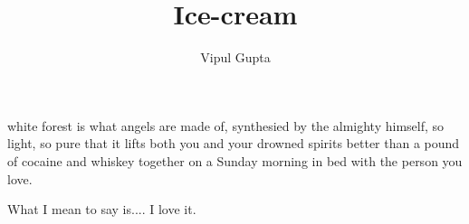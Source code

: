 \documentclass{article}
\begin{document}
\title{Ice-cream}
white forest is what angels are made of, synthesied by the almighty himself, so light, so pure that it lifts both you and your drowned spirits better than a pound of cocaine and whiskey together on a Sunday morning in bed with the person you love.\

What I mean to say is.... I love it. 
\author{Vipul Gupta}
\end{document}
